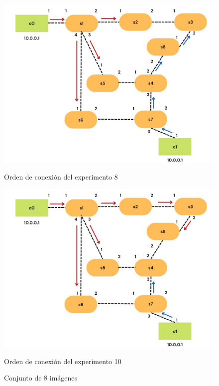 \documentclass[a4paper, 12pt]{book}
\begin{document}
\begin{figure}[H]
 		\begin{minipage}[b]{0.35\textwidth}
 			\centering
 			\includegraphics[width=\textwidth]{img/escenario1_2c_7}
 			\caption{Orden de conexión del experimento 8}
 		\end{minipage}
 		\hfill
 		\begin{minipage}[b]{0.35\textwidth}
 			\centering
 			\includegraphics[width=\textwidth]{img/escenario1_2c_8}
 			\caption{Orden de conexión del experimento 10}
 		\end{minipage}
 		
 		\caption{Conjunto de 8 imágenes}
 		\label{fig:conjunto}
 	\end{figure}
 	
\end{document}
